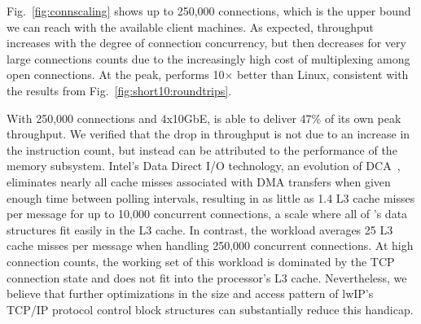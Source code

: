 


Fig.~\ref{fig:connscaling} shows up to 250,000
connections, which is the upper bound we can reach with the available
client machines.  As expected, throughput increases with the degree of
connection concurrency, but then decreases for very large connections
counts due to the increasingly high cost of multiplexing among open
connections.  At the peak, \ix performs 10$\times$ better than
Linux, consistent with the results from
Fig.~\ref{fig:short10:roundtrips}.

With 250,000 connections and 4x10GbE, \ix is able to deliver
47\% of its own peak throughput.  We verified that the drop
in throughput is not due to an increase in the instruction count, but
instead can be attributed to the performance of the memory
subsystem. Intel's Data Direct I/O technology, an evolution of
DCA~\cite{DBLP:conf/isca/HuggahalliIT05}, eliminates nearly all cache
misses associated with DMA transfers when given enough time between
polling intervals, resulting in as little as 1.4 L3 cache misses per
message for up to 10,000 concurrent connections, a scale where all of \ix's data structures fit easily in the L3 cache.  In contrast, the
workload averages 25 L3 cache misses per message when handling 250,000
concurrent connections.  At high connection counts, the working set of
this workload is dominated by the TCP connection state and does not
fit into the processor's L3 cache.  Nevertheless, we believe that
further optimizations in the size and access pattern of lwIP's TCP/IP
protocol control block structures can substantially reduce this
handicap.
  



